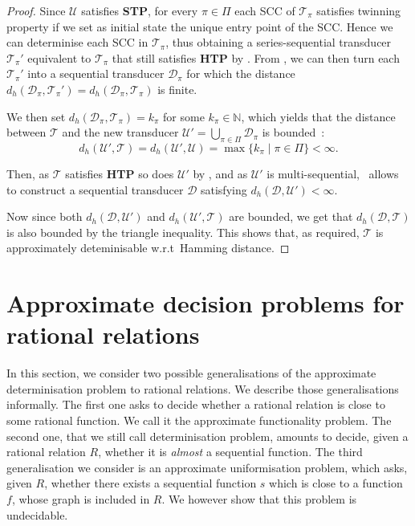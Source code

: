 \documentclass[a4paper,UKenglish,cleveref, autoref, thm-restate,authorcolumns, colorlinks]{lipics-v2021}
\newcommand\calD{\mathcal{D}}
\newcommand\calT{\mathcal{T}}
\newcommand\calU{\mathcal{U}}
\newcommand{\STP}[0]{\textbf{STP}}
\newcommand{\HTP}[0]{\textbf{HTP}}
\newcommand{\dHam}[2]{d_{h}(#1,#2)}
\begin{document}
{\begin{proof}
    Since $\calU$ satisfies \STP{}, for every $\pi \in \Pi$
    each SCC of $\calT_\pi$ satisfies twinning property
    if we set as initial state the unique entry point of the SCC.
    Hence we can determinise each SCC in $\calT_\pi$,
    thus obtaining a series-sequential transducer $\calT_\pi'$
    equivalent to $\calT_\pi$ that still satisfies \HTP{} by .
    From ,
    we can then turn each $\calT_\pi'$ into a  sequential transducer $\calD_\pi$
    for which the distance $\dHam{\calD_\pi}{\calT_\pi'} = \dHam{\calD_\pi}{\calT_\pi}$ is finite. 
    
    We then set $\dHam{\calD_\pi}{\calT_\pi} = k_\pi$ for some $k_\pi \in \mathbb{N}$,
    which yields that the distance between $\calT$ and the new transducer
    $\calU' = \bigcup_{\pi\in \Pi} \calD_\pi$ is bounded~:
    \[
    \dHam{\calU'}{\calT} = \dHam{\calU'}{\calU} = \max \{ k_\pi \mid \pi\in \Pi\} < \infty.
    \]

    Then, as $\calT$ satisfies \HTP{} so does $\calU'$ by ,
    and as $\calU'$ is multi-sequential,~
    allows to construct a sequential transducer $\calD$ satisfying
    $\dHam{\calD}{\calU'} < \infty$.

    Now since both $\dHam{\calD}{\calU'}$ and $\dHam{\calU'}{\calT}$
    are bounded, we get that $\dHam{\calD}{\calT}$
    is also bounded by the triangle inequality.
    This shows that, as required,
    $\calT$ is approximately deteminisable w.r.t~Hamming distance.
\end{proof}

\section{Approximate decision problems for rational relations}

In this section, we consider two possible generalisations of the approximate determinisation problem to rational relations. We describe those generalisations informally. The first one asks to decide whether a rational relation is close to some rational function. We call it the approximate functionality problem. The second one, that we still call determinisation problem, amounts to decide, given a rational relation $R$, whether it is \emph{almost} a sequential function. The third generalisation we consider is an approximate uniformisation problem, which asks, given $R$, whether there exists a sequential function $s$ which is close to a function $f$, whose graph is included in $R$. We however show that this problem is undecidable. 

}
\end{document}
